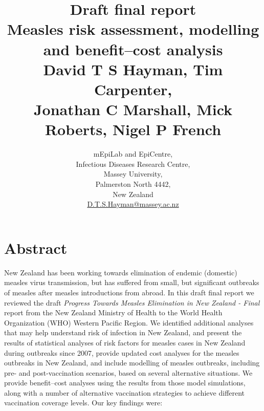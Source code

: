 \documentclass{article}
\begin{document}


\title{Draft final report\\ Measles risk assessment, modelling and benefit--cost analysis\\ \vspace{2 mm} {\large David T S Hayman, Tim Carpenter,\\ Jonathan C Marshall, Mick Roberts, Nigel P French}}
\author{mEpiLab and EpiCentre,\\ Infectious Diseases Research Centre,\\
Massey University,\\
Palmerston North 4442,\\
New Zealand\\
\href{mailto: D.T.S.Hayman@massey.ac.nz}{D.T.S.Hayman@massey.ac.nz}}  %
\maketitle

\section{Abstract}

New Zealand has been working towards elimination of endemic (domestic) measles virus transmission, but has suffered from small, but significant outbreaks of measles after measles introductions from abroad. In this draft final report we reviewed the draft \emph {Progress Towards Measles Elimination in New Zealand - Final} report from the New Zealand Ministry of Health to the World Health Organization (WHO) Western Pacific Region. We identified additional analyses that may help understand risk of infection in New Zealand, and present the results of statistical analyses of risk factors for measles cases in New Zealand during outbreaks since 2007, provide updated cost analyses for the measles outbreaks in New Zealand, and include modelling of measles outbreaks, including pre- and post-vaccination scenarios, based on several alternative situations. We provide benefit--cost analyses using the results from those model simulations, along with a number of alternative vaccination strategies to achieve different vaccination coverage levels. Our key findings were:
\end{document}
